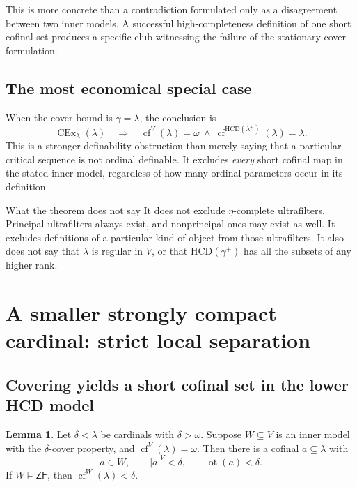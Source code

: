 \documentclass[11pt,letterpaper]{article}
\theoremstyle{definition}
\newtheorem{lemma}[definition]{Lemma}
\newcommand{\ZF}{\mathsf{ZF}}
\newcommand{\CEx}{\operatorname{CEx}}
\newcommand{\cf}{\operatorname{cf}}
\newcommand{\ot}{\operatorname{ot}}
\newcommand{\HCD}{\mathrm{HCD}}
\numberwithin{equation}{section}
\begin{document}
This is more concrete than a contradiction formulated only as a disagreement between two inner models. A successful high-completeness definition of one short cofinal set produces a specific club witnessing the failure of the stationary-cover formulation.

\subsection{The most economical special case}

When the cover bound is $\gamma=\lambda$, the conclusion is
\begin{equation}\label{eq:lambda-case}
 \CEx_\lambda(\lambda)
   \quad\Longrightarrow\quad
 \cf^V(\lambda)=\omega
   \ \wedge\ \cf^{\HCD(\lambda^+)}(\lambda)=\lambda.
\end{equation}
This is a stronger definability obstruction than merely saying that a particular critical sequence is not ordinal definable. It excludes \emph{every} short cofinal map in the stated inner model, regardless of how many ordinal parameters occur in its definition.

\begin{assessment}{What the theorem does not say}
It does not exclude $\eta$-complete ultrafilters. Principal ultrafilters always exist, and nonprincipal ones may exist as well. It excludes definitions of a particular kind of object from those ultrafilters. It also does not say that $\lambda$ is regular in $V$, or that $\HCD(\gamma^+)$ has all the subsets of any higher rank.
\end{assessment}

\section{A smaller strongly compact cardinal: strict local separation}\label{sec:local}

\subsection{Covering yields a short cofinal set in the lower HCD model}

\begin{lemma}\label{lem:cover-cofinal}
Let $\delta<\lambda$ be cardinals with $\delta>\omega$. Suppose $W\subseteq V$ is an inner model with the $\delta$-cover property, and $\cf^V(\lambda)=\omega$. Then there is a cofinal $a\subseteq\lambda$ with
\[
 a\in W,\qquad |a|^V<\delta,\qquad\ot(a)<\delta.
\]
If $W\models\ZF$, then $\cf^W(\lambda)<\delta$.
\end{lemma}
\end{document}
